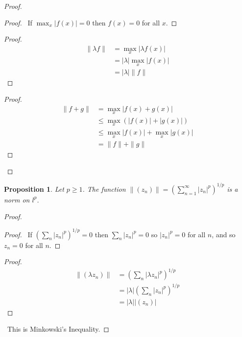 \documentclass{book}
\let\qed\relax
\newtheorem{prop}[ax]{Proposition}
\theoremstyle{definition}
\begin{document}
\begin{proof}
\pf
{}
\begin{proof}
	\pf\ If $\max_x |f(x)| = 0$ then $f(x) = 0$ for all $x$.
\end{proof}
\begin{proof}
	\pf
	\begin{align*}
		\|\lambda f\| & = \max_x |\lambda f(x)| \\
		& = |\lambda| \max_x |f(x)| \\
		& = |\lambda| \|f\|
	\end{align*}
\end{proof}
\begin{proof}
	\pf
	\begin{align*}
		\|f+g\| & = \max_x |f(x) + g(x)| \\
		& \leq \max_x (|f(x)| + |g(x)|) \\
		& \leq \max_x |f(x)| + \max_x |g(x)| \\
		& = \| f \| + \| g \|
	\end{align*}
\end{proof}
\qed
\end{proof}

\begin{prop}
Let $p \geq 1$.
The function $\|(z_n)\| = \left( \sum_{n=1}^\infty |z_n|^p \right)^{1/p}$ is a norm on $l^p$.
\end{prop}

\begin{proof}
\pf
{}
\begin{proof}
	\pf\ If $(\sum_n |z_n|^p)^{1/p} = 0$ then $\sum_n |z_n|^p = 0$ so $|z_n|^p = 0$ for all $n$, and so $z_n = 0$ for all $n$.
\end{proof}
\begin{proof}
	\pf
	\begin{align*}
		\| (\lambda z_n) \| & = \left( \sum_n |\lambda z_n|^p \right)^{1/p} \\
		& = |\lambda| \left( \sum_n |z_n|^p \right)^{1/p} \\
		& = |\lambda| \left| (z_n) \right|
	\end{align*}
\end{proof}
	\pf\ This is Minkowski's Inequality.
\qed
\end{proof}
\end{document}
